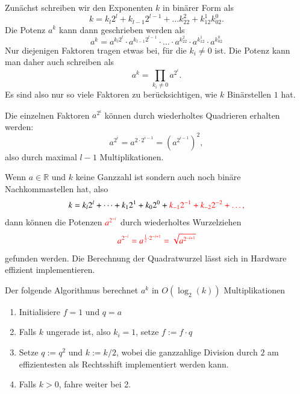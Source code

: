 Zunächst schreiben wir den Exponenten $k$ in binärer Form als
\[
k = k_l2^l + k_{l-1}2^{l-1} + \dots k_22^2+k_12^1 k_02^0.
\]
Die Potenz $a^k$ kann dann geschrieben werden als
\[
a^k
=
a^{k_l2^l} \cdot a^{k_{l-1}2^{l-1}} \cdot \dots \cdot
a^{k_22^2} \cdot a^{k_12^1} \cdot a^{k_02^0}
\]
Nur diejenigen Faktoren tragen etwas bei, für die $k_i\ne 0$ ist.
Die Potenz kann man daher auch schreiben als
\[
a^k
=
\prod_{k_i\ne 0} a^{2^i}.
\]
Es sind also nur so viele Faktoren zu berücksichtigen, wie $k$ 
Binärstellen $1$ hat.

Die einzelnen Faktoren $a^{2^i}$ können durch wiederholtes Quadrieren
erhalten werden:
\[
a^{2^i} = a^{2\cdot 2^{i-1}} = (a^{2^{i-1}})^2,
\]
also durch maximal $l-1$ Multiplikationen.

Wenn $a\in\mathbb{R}$ und $k$ keine Ganzzahl ist sondern auch noch
binäre Nachkommastellen hat, also
\[
k=k_l2^l + \dots + k_12^1 + k_02^0 + {\color{red}k_{-1}2^{-1} + k_{-2}2^{-2}+\dots,}
\]
dann können die Potenzen ${\color{red}a^{2^{-i}}}$ durch wiederholtes Wurzelziehen
\[
\color{red}
a^{2^{-i}} = a^{\frac12\cdot 2^{-i+1}} = \sqrt{a^{2^{-i+1}}}
\]
gefunden werden.
Die Berechnung der Quadratwurzel lässt sich in Hardware effizient
implementieren.

\begin{algorithmus}
\label{buch:crypto:teile-und-hersche}
Der folgende Algorithmus berechnet $a^k$ in $O(\log_2(k))$
Multiplikationen
\begin{enumerate}
\item Initialisiere $f=1$ und $q=a$
\item Falls $k$ ungerade ist, also $k_i=1$, setze $f:=f\cdot q$ 
\item Setze $q:=q^2$ und $k := k/2$, wobei die ganzzahlige Division durch $2$
am effizientesten als Rechtsshift implementiert werden kann.
\item Falls $k>0$, fahre weiter bei 2.
\end{enumerate}
\end{algorithmus}

